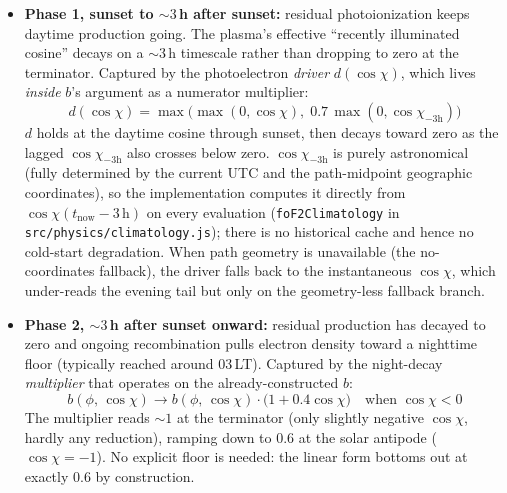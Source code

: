 \documentclass[11pt,a4paper]{article}
\newcommand{\SI}[2]{#1\,\text{#2}}
\begin{document}
\begin{itemize}[nosep]
  \item \textbf{Phase 1, sunset to $\sim 3$\,h after sunset:}
        residual photoionization keeps daytime production going.
        The plasma's effective ``recently illuminated cosine''
        decays on a $\sim 3$\,h timescale rather than dropping to
        zero at the terminator. Captured by the photoelectron
        \emph{driver} $d(\cos\chi)$, which lives \emph{inside}
        $b$'s argument as a numerator multiplier:
        \begin{equation}\label{eq:fof2-driver}
          d(\cos\chi) = \max\!\bigl(\max(0,\cos\chi),\;
                                    0.7\,\max(0,\cos\chi_{-3\text{h}})\bigr)
        \end{equation}
        $d$ holds at the daytime cosine through sunset, then decays
        toward zero as the lagged $\cos\chi_{-3\text{h}}$ also
        crosses below zero.  $\cos\chi_{-3\text{h}}$ is purely
        astronomical (fully determined by the current UTC and
        the path-midpoint geographic coordinates), so the
        implementation computes it directly from
        $\cos\chi(t_{\text{now}} - \SI{3}{h})$ on every evaluation
        (\texttt{foF2Climatology} in
        \texttt{src/physics/climatology.js}); there is no
        historical cache and hence no cold-start degradation.
        When path geometry is unavailable (the no-coordinates
        fallback), the driver falls back to the instantaneous
        $\cos\chi$, which under-reads the evening tail but only on
        the geometry-less fallback branch.
  \item \textbf{Phase 2, $\sim 3$\,h after sunset onward:}
        residual production has decayed to zero and ongoing
        recombination pulls electron density toward a nighttime
        floor (typically reached around $03$\,LT). Captured by the
        night-decay \emph{multiplier} that operates on the
        already-constructed $b$:
        \begin{equation}\label{eq:fof2-nightdecay}
          b(\phi,\,\cos\chi) \to b(\phi,\,\cos\chi)\cdot
            \bigl(1 + 0.4\cos\chi\bigr)
          \quad \text{when } \cos\chi < 0
        \end{equation}
        The multiplier reads $\sim 1$ at the terminator (only
        slightly negative $\cos\chi$, hardly any reduction),
        ramping down to $0.6$ at the solar antipode
        ($\cos\chi = -1$).  No explicit floor is needed:
        the linear form bottoms out at exactly $0.6$
        by construction.
\end{itemize}
\end{document}
